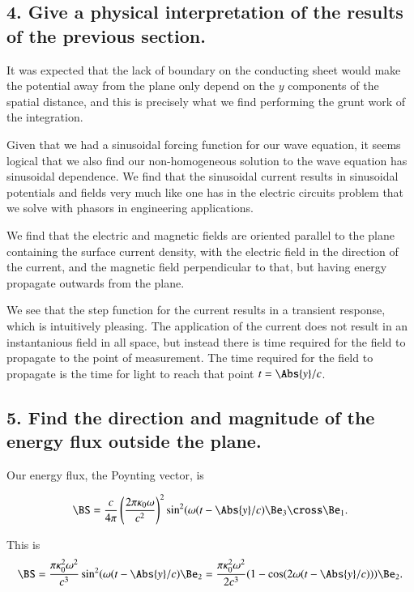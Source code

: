 \subsection{4. Give a physical interpretation of the results of the previous section.}

It was expected that the lack of boundary on the conducting sheet would make the potential away from the plane only depend on the $y$ components of the spatial distance, and this is precisely what we find performing the grunt work of the integration.  

Given that we had a sinusoidal forcing function for our wave equation, it seems logical that we also find our non-homogeneous solution to the wave equation has sinusoidal dependence.  We find that the sinusoidal current results in sinusoidal potentials and fields very much like one has in the electric circuits problem that we solve with phasors in engineering applications.

We find that the electric and magnetic fields are oriented parallel to the plane containing the surface current density, with the electric field in the direction of the current, and the magnetic field perpendicular to that, but having energy propagate outwards from the plane.

We see that the step function for the current results in a transient response, which is intuitively pleasing.  The application of the current does not result in an instantanious field in all space, but instead there is time required for the field to propagate to the point of measurement.  The time required for the field to propagate is the time for light to reach that point $t = \Abs{y}/c$.

\subsection{5. Find the direction and magnitude of the energy flux outside the plane.}

Our energy flux, the Poynting vector, is

\begin{equation}\label{eqn:relElectroDynProblemSet5P1:220}
\BS 
= \frac{c}{4\pi}
\left( \frac{
2 \pi \kappa_0 \omega
}{c^2} \right)^2 \sin^2(\omega(t - \Abs{y}/c) \Be_3 \cross \Be_1.
\end{equation}

This is
\begin{equation}\label{eqn:relElectroDynProblemSet5P1:240}
\BS 
= 
\frac{ \pi \kappa_0^2 \omega^2 }{c^3} \sin^2(\omega(t - \Abs{y}/c) \Be_2
= 
\frac{ \pi \kappa_0^2 \omega^2 }{2 c^3} (1 - \cos( 2 \omega(t - \Abs{y}/c) ) ) \Be_2.
\end{equation}

